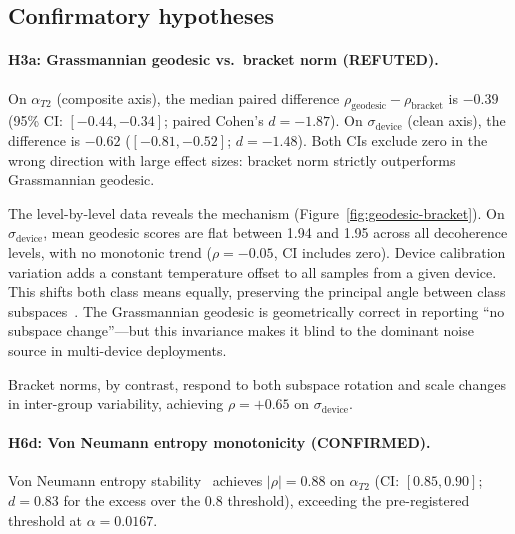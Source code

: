 \documentclass[11pt]{article}
\begin{document}
\subsection{Confirmatory hypotheses}

\paragraph{H3a: Grassmannian geodesic vs.\ bracket norm (REFUTED).}
On $\alpha_{T2}$ (composite axis), the median paired difference
$\rho_\text{geodesic} - \rho_\text{bracket}$ is $-0.39$ (95\% CI:
$[-0.44, -0.34]$; paired Cohen's $d = -1.87$).  On
$\sigma_\text{device}$ (clean axis), the difference is $-0.62$
($[-0.81, -0.52]$; $d = -1.48$).  Both CIs exclude zero in the wrong
direction with large effect sizes: bracket norm strictly outperforms
Grassmannian geodesic.

The level-by-level data reveals the mechanism
(Figure~\ref{fig:geodesic-bracket}).
On $\sigma_\text{device}$, mean geodesic scores are flat between 1.94
and 1.95 across all decoherence levels, with no monotonic trend
($\rho = -0.05$, CI includes zero).
Device calibration variation adds a constant temperature offset to all
samples from a given device.  This shifts both class means equally,
preserving the principal angle between class
subspaces~\citep{bjorck1973numerical,knyazev2002principal}.  The Grassmannian geodesic is
geometrically correct in reporting ``no subspace change''---but this invariance makes it blind to the dominant
noise source in multi-device deployments.

Bracket norms, by contrast, respond to both subspace rotation and
scale changes in inter-group variability, achieving $\rho = +0.65$
on $\sigma_\text{device}$.

\paragraph{H6d: Von Neumann entropy monotonicity (CONFIRMED).}
Von Neumann entropy stability~\citep{neumann1955mathematical} achieves
$|\rho| = 0.88$ on $\alpha_{T2}$ (CI: $[0.85, 0.90]$; $d = 0.83$
for the excess over the 0.8 threshold), exceeding the pre-registered
threshold at $\alpha = 0.0167$.
\end{document}
